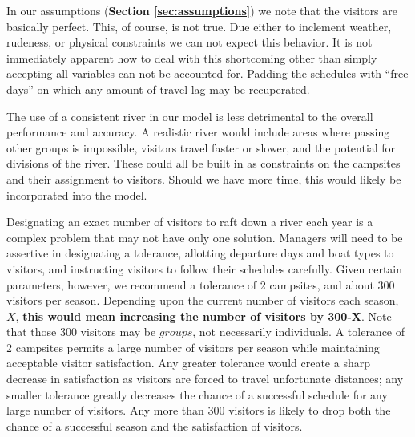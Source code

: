 \documentclass[11pt]{article} %
\begin{document}
In our assumptions (\textbf{Section \ref{sec:assumptions}}) we note that the
visitors are basically perfect.  This, of course, is not true.  Due either to 
inclement weather, rudeness, or physical constraints we can not expect this 
behavior.  It is not immediately apparent
how to deal with this shortcoming other than simply accepting all variables 
can not be accounted for.  Padding the schedules with ``free days'' on
which any amount of travel lag may be recuperated.

The use of a consistent river in our model is less detrimental to the
overall performance and accuracy.  A realistic river would include areas
where passing other groups is impossible, visitors travel faster or slower,
and the potential for divisions of the river.  These could all be built in
as constraints on the campsites and their assignment to visitors.  Should
we have more time, this would likely be incorporated into the model.

Designating an exact number of visitors to raft down a river each year is
a complex problem that may not have only one solution. Managers will need
to be assertive in designating a tolerance, allotting departure days and
boat types to visitors, and instructing visitors to follow their schedules
carefully. Given certain parameters, however, we recommend a tolerance of
2 campsites, and about 300 visitors per season. Depending upon the current
number of visitors each season, $X$, \textbf{this would mean increasing the number
of visitors by 300-X}.  Note that those 300 visitors may be $groups$, not
necessarily individuals.  A tolerance of 2 campsites
permits a large number of visitors per season while maintaining acceptable
visitor satisfaction. Any greater tolerance would create a sharp decrease
in satisfaction as visitors are forced to travel unfortunate distances; any
smaller tolerance greatly decreases the chance of a successful schedule for
any large number of visitors. Any more than 300 visitors is likely to drop
both the chance of a successful season and the satisfaction of visitors.


\newpage




\end{document}
